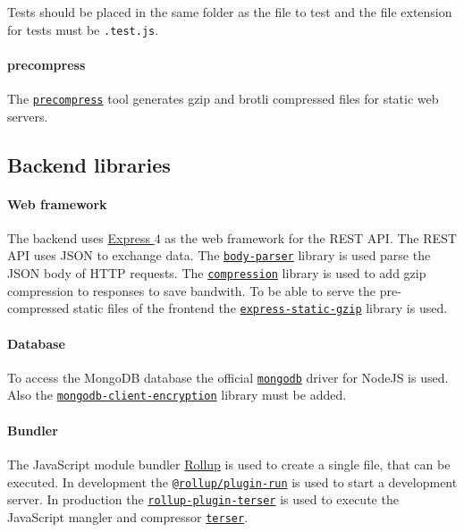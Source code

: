 Tests should be placed in the same folder as the file to test and the file extension for tests must be \texttt{.test.js}.

\paragraph{precompress}
The \texttt{\href{https://www.npmjs.com/package/precompress}{precompress}} tool generates gzip and brotli compressed files for static web servers.

\subsection{Backend libraries}

\paragraph{Web framework}
The backend uses \href{https://expressjs.com}{Express $4$} as the web framework for the REST API.
The REST API uses JSON to exchange data.
The \texttt{\href{https://www.npmjs.com/package/body-parser}{body-parser}} library is used parse the JSON body of HTTP requests.
The \texttt{\href{https://www.npmjs.com/package/compression}{compression}} library is used to add gzip compression to responses to save bandwith.
To be able to serve the pre-compressed static files of the frontend the \texttt{\href{https://www.npmjs.com/package/express-static-gzip}{express-static-gzip}} library is used.

\paragraph{Database}
To access the MongoDB database the official \texttt{\href{https://www.npmjs.com/package/mongodb}{mongodb}} driver for NodeJS is used.
Also the \texttt{\href{https://www.npmjs.com/package/mongodb-client-encryption}{mongodb-client-encryption}} library must be added.

\paragraph{Bundler}
The JavaScript module bundler \href{https://rollupjs.org}{Rollup} is used to create a single file, that can be executed.
In development the \texttt{\href{https://www.npmjs.com/package/@rollup/plugin-run}{@rollup/plugin-run}} is used to start a development server.
In production the \texttt{\href{https://www.npmjs.com/package/rollup-plugin-terser}{rollup-plugin-terser}} is used to execute the JavaScript mangler and compressor \texttt{\href{https://terser.org}{terser}}.
